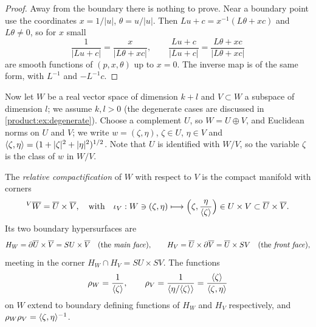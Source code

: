 \begin{proof}
Away from the boundary there is nothing to prove. Near a boundary point use the
coordinates $x=1/|u|$, $\theta=u/|u|$. Then $L u+c=x^{-1}(L\theta+xc)$ and
$L\theta\ne0$, so for $x$ small
\begin{equation*}
\frac1{|Lu+c|}=\frac{x}{|L\theta+xc|},\qquad
\frac{Lu+c}{|Lu+c|}=\frac{L\theta+xc}{|L\theta+xc|}
\end{equation*}
are smooth functions of $(p,x,\theta)$ up to $x=0$. The inverse map is of the
same form, with $L^{-1}$ and $-L^{-1}c$.
\end{proof}

Now let $W$ be a real vector space of dimension $k+l$ and $V\subset W$ a subspace
of dimension $l$; we assume $k,l>0$ (the degenerate cases are discussed in
\cref{product:ex:degenerate}). Choose a complement $U$, so $W=U\oplus V$, and
Euclidean norms on $U$ and $V$; we write $w=(\zeta,\eta)$, $\zeta\in U$,
$\eta\in V$ and $\langle \zeta,\eta\rangle=(1+|\zeta|^2+|\eta|^2)^{1/2}$. Note that $U$ is
identified with $W/V$, so the variable $\zeta$ is the class of $w$ in $W/V$.

\begin{definition}\label{product:def:relative}
The \emph{relative compactification} of $W$ with respect to $V$ is the compact
manifold with corners
\begin{equation*}
{}^{V}\overline{W}=\overline{U}\times\overline{V},\quad\text{with}\quad
\iota_V:W\ni(\zeta,\eta)\longmapsto\Big(\zeta,\frac{\eta}{\langle \zeta\rangle}\Big)\in
U\times V\subset\overline{U}\times\overline{V}.
\end{equation*}
Its two boundary hypersurfaces are
\begin{equation*}
H_W=\partial\overline{U}\times\overline{V}=SU\times\overline{V}\quad\text{(the \emph{main face})},\qquad
H_V=\overline{U}\times\partial\overline{V}=\overline{U}\times SV\quad\text{(the \emph{front face})},
\end{equation*}
meeting in the corner $H_W\cap H_V=SU\times SV$. The functions
\begin{equation*}
\rho_W=\frac1{\langle \zeta\rangle},\qquad\rho_V=\frac1{\langle \eta/\langle \zeta\rangle\rangle}=
\frac{\langle \zeta\rangle}{\langle \zeta,\eta\rangle}
\end{equation*}
on $W$ extend to boundary defining functions of $H_W$ and $H_V$ respectively, and
$\rho_W\rho_V=\langle \zeta,\eta\rangle^{-1}$.
\end{definition}


